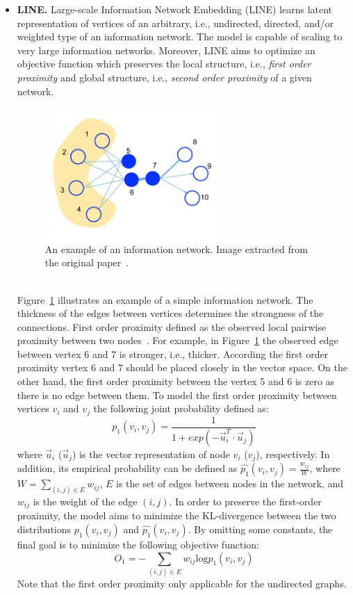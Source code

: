 \begin{itemize}
\item \textbf{LINE.}
Large-scale Information Network Embedding (LINE) learns latent representation of vertices of an arbitrary, i.e., undirected, directed, and/or weighted type of an information network. The model is capable of scaling to very large information networks. Moreover, LINE aims to optimize an objective function which preserves the local structure, i.e., \textit{first order proximity} and global structure, i.e., \textit{second order proximity} of a given network. 
\begin{figure}[h]
\centering
 \includegraphics[height=5cm]{Figures/fig_LINE.png}
 \caption{An example of an information network. Image extracted from the original paper~\cite{LINE}.}
 \label{fig:LINE}
\end{figure} \\
Figure~\ref{fig:LINE} illustrates an example of a simple information network. The thickness of the edges between vertices determines the strongness of the connections. 
First order proximity defined as the observed local pairwise proximity between two nodes~\cite{DBLP:journals/tkde/CuiWPZ19}. For example, in Figure~\ref{fig:LINE} the observed edge between vertex 6 and 7 is stronger, i.e., thicker. According the first order proximity vertex 6 and 7 should be placed closely in the vector space. On the other hand, the first order proximity between the vertex 5 and 6 is zero as there is no edge between them.
To model the first order proximity between vertices $v_i$ and $v_j$ the following joint probability defined as:
\begin{equation} \label{eq:jointProb}
p_{1}(v_{i},v_{j})=\frac{1}{1+exp(-\vec{u}_{i}^{T}\cdot\vec{u}_{j})}
\end{equation}
where $\vec{u}_{i}$ ($\vec{u}_{j}$) is the vector representation of node $v_i$ ($v_j$), respectively. In addition, its empirical probability can be defined as $\hat{p_1}(v_i,v_j)=\frac{w_{ij}}{W}$, where $W=\sum_{(i,j) \in E}w_{ij}$, $E$ is the set of edges between nodes in the network, and $w_{ij}$ is the weight of the edge $(i,j)$.
In order to preserve the first-order proximity, the model aims to minimize the KL-divergence between the two distributions $p_{1}(v_{i},v_{j})$ and $\hat{p_1}(v_i,v_j)$. By omitting some constants, the final goal is to minimize the following objective function:
\begin{equation}
O_{1}=-\sum_{(i,j) \in E}w_{ij} \textrm{log}p_{1}(v_{i},v_{j})
\end{equation}
Note that the first order proximity only applicable for the undirected graphs.


\end{itemize}
